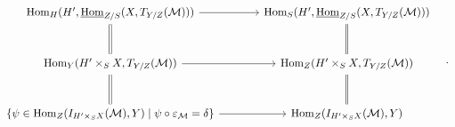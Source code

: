 \[
\begin{tikzcd}[column sep=large,row sep=large]
\operatorname{Hom}_H(H',\underline{\operatorname{Hom}}_{Z/S}(X,T_{Y/Z}(\mathcal M))) \arrow[r] \arrow[d,equal] & \operatorname{Hom}_S(H',\underline{\operatorname{Hom}}_{Z/S}(X,T_{Y/Z}(\mathcal M))) \arrow[d,equal]\\
\operatorname{Hom}_Y(H'\times_S X,T_{Y/Z}(\mathcal M)) \arrow[r] \arrow[d,equal] & \operatorname{Hom}_Z(H'\times_S X,T_{Y/Z}(\mathcal M)) \arrow[d,equal]\\
\{\psi\in\operatorname{Hom}_Z(I_{H'\times_S X}(\mathcal M),Y)\mid\psi\circ\varepsilon_{\mathcal M}=\delta\} \arrow[r] & \operatorname{Hom}_Z(I_{H'\times_S X}(\mathcal M),Y)
\end{tikzcd}\quad .
\]
